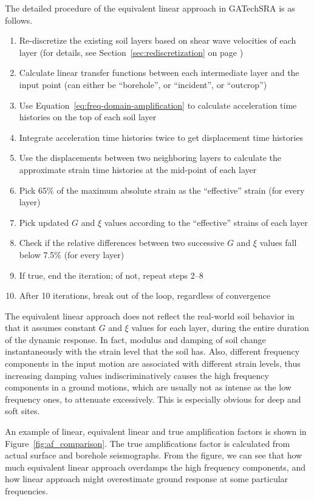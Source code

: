 \documentclass[11pt,letterpaper]{article}
\begin{document}
The detailed procedure of the equivalent linear approach in GATechSRA is as follows.
\begin{enumerate}
    \item Re-discretize the existing soil layers based on shear wave velocities of each layer (for details, see Section~\ref{sec:rediscretization} on page \pageref{sec:rediscretization})
    \item Calculate linear transfer functions between each intermediate layer and the input point (can either be ``borehole'', or ``incident'', or ``outcrop'')
    \item Use Equation~\eqref{eq:freq-domain-amplification} to calculate acceleration time histories on the top of each soil layer
    \item Integrate acceleration time histories twice to get displacement time histories
    \item Use the displacements between two neighboring layers to calculate the approximate strain time histories at the mid-point of each layer
    \item Pick 65\% of the maximum absolute strain as the ``effective'' strain (for every layer)
    \item Pick updated $G$ and $\xi$ values according to the ``effective'' strains of each layer
    \item Check if the relative differences between two successive $G$ and $\xi$ values fall below 7.5\% (for every layer)
    \item If true, end the iteration; of not, repeat steps 2--8
    \item After 10 iterations, break out of the loop, regardless of convergence
\end{enumerate}

The equivalent linear approach does not reflect the real-world soil behavior in that it assumes constant $G$ and $\xi$ values for each layer, during the entire duration of the dynamic response. In fact, modulus and damping of soil change instantaneously with the strain level that the soil has. Also, different frequency components in the input motion are associated with different strain levels, thus increasing damping values indiscriminatively causes the high frequency components in a ground motions, which are usually not as intense as the low frequency ones, to attenuate excessively. This is especially obvious for deep and soft sites.

An example of linear, equivalent linear and true amplification factors is shown in Figure~\ref{fig:af_comparison}. The true amplifications factor is calculated from actual surface and borehole seismographs. From the figure, we can see that how much equivalent linear approach overdamps the high frequency components, and how linear approach might overestimate ground response at some particular frequencies.
\end{document}
